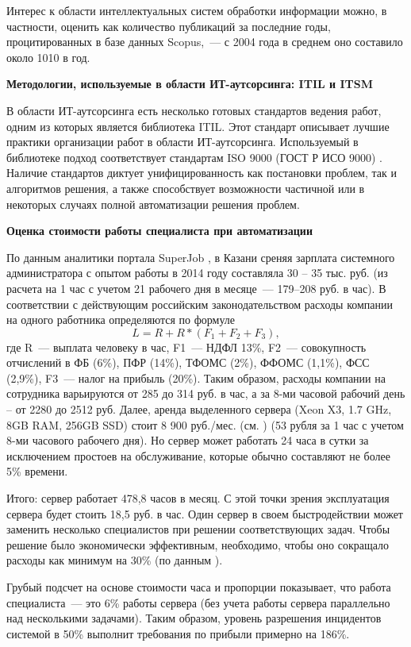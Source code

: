 Интерес к области интеллектуальных систем обработки информации можно, в частности, оценить как количество публикаций за последние годы, процитированных в базе данных Scopus,~--- с 2004 года в среднем оно составило около 1010 в год. \par
\textbf{Методологии, используемые в области ИТ-аутсорсинга: ITIL и ITSM} \par
В области ИТ-аутсорсинга есть несколько готовых стандартов ведения работ, одним из которых является библиотека ITIL. Этот стандарт описывает лучшие практики организации работ в области ИТ-аутсорсинга. Используемый в библиотеке подход соответствует стандартам ISO 9000 (ГОСТ Р ИСО 9000) \cite{ITIL1, ITIL2, ITIL3}.
Наличие стандартов диктует унифицированность как постановки проблем, так и алгоритмов решения, а также способствует возможности частичной или в некоторых случаях полной автоматизации решения проблем. \par
\clearpage
\textbf{Оценка стоимости работы специалиста при автоматизации} \par
По данным аналитики портала SuperJob \cite{SuperJob}, в Казани среняя зарплата системного администратора с опытом работы в 2014 году составляла 30 – 35 тыс. руб. (из расчета на 1 час с учетом 21 рабочего дня в месяце~--- 179--208 руб. в час). В соответствии с действующим российским законодательством \cite{FiscalCodecs} расходы компании на одного работника определяются по формуле
\[
L = R + R*(F_1 +F_2+F_3),
\]
где R~--- выплата человеку в час, F1~--- НДФЛ 13\%, F2~--- совокупность отчислений в ФБ (6\%), ПФР (14\%), ТФОМС (2\%), ФФОМС (1,1\%), ФСС (2,9\%), F3~--- налог на прибыль (20\%). Таким образом, расходы компании на сотрудника варьируются от 285 до 314 руб. в час, а за 8-ми часовой рабочий день – от 2280 до 2512 руб. Далее, аренда выделенного сервера (Xeon X3, 1.7 GHz, 8GB RAM, 256GB SSD) стоит 8 900 руб./мес. (см. \cite{TimeWeb}) (53 рубля за 1 час с учетом 8-ми часового рабочего дня). Но сервер может работать 24 часа в сутки за исключением простоев на обслуживание, которые обычно составляют не более 5\% времени. \par Итого: сервер работает 478,8 часов в месяц. С этой точки зрения эксплуатация сервера будет стоить 18,5 руб. в час. Один сервер в своем быстродействии может заменить несколько специалистов при решении соответствующих задач. Чтобы решение было экономически эффективным, необходимо, чтобы оно сокращало расходы как минимум на 30\% (по данным \icl). \par Грубый подсчет на основе стоимости часа и пропорции показывает, что работа специалиста~--- это 6\% работы сервера (без учета работы сервера параллельно над несколькими задачами). Таким образом, уровень разрешения инцидентов системой в 50\% выполнит требования по прибыли примерно на 186\%.

